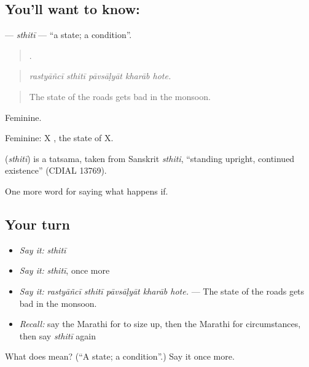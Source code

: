 \subsection*{You'll want to know: }
\textbf{} — \emph{sthitī} — \textquotedblleft{}a state; a condition\textquotedblright{}.

\begin{quote}
    .
\end{quote}

\begin{quote}
\emph{rastyāñcī sthitī pāvsāḷyāt kharāb hote.}
\end{quote}

\begin{quote}
The state of the roads gets bad in the monsoon.
\end{quote}

Feminine.

Feminine: X  , the state of X.

\begin{cousinweb}
\textbf{} (\emph{sthitī}) is a tatsama, taken from Sanskrit \emph{sthiti}, \textquotedblleft{}standing upright, continued existence\textquotedblright{} (CDIAL 13769).
\end{cousinweb}

\begin{grammarlens}[title={What you've built}]
One more word for saying what happens if.
\end{grammarlens}

\subsection*{Your turn}
\begin{itemize}
\raggedright
  \item \emph{Say it:} \emph{sthitī}
  \item \emph{Say it:} \emph{sthitī}, once more
  \item \emph{Say it:} \emph{rastyāñcī sthitī pāvsāḷyāt kharāb hote.} — The state of the roads gets bad in the monsoon.
  \item \emph{Recall:} say the Marathi for to size up, then the Marathi for circumstances, then say \emph{sthitī} again
\end{itemize}

\begin{tcolorbox}[breakable,colback=teal!4,colframe=teal!35!black,title={Before you move on}]
What does  mean? (\textquotedblleft{}A state; a condition\textquotedblright{}.) Say it once more.
\end{tcolorbox}
